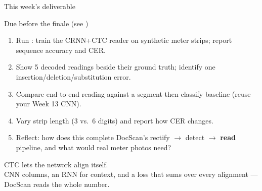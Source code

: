 \documentclass[10pt,aspectratio=169]{beamer}
\begin{document}
\begin{frame}{This week's deliverable}
  \begin{alertblock}{Due before the finale (see )}
    \begin{enumerate}
      \item Run : train the CRNN+CTC reader on synthetic meter strips; report sequence accuracy and CER.
      \item Show 5 decoded readings beside their ground truth; identify one insertion/deletion/substitution error.
      \item Compare end-to-end reading against a segment-then-classify baseline (reuse your Week 13 CNN).
      \item Vary strip length (3 vs.\ 6 digits) and report how CER changes.
      \item Reflect: how does this complete DocScan's rectify $\to$ detect $\to$ \textbf{read} pipeline, and what would real meter photos need?
    \end{enumerate}
  \end{alertblock}
\end{frame}

\begin{frame}[standout]
  CTC lets the network align itself.\\[4pt]
  \normalsize CNN columns, an RNN for context, and a loss that sums over every alignment --- DocScan reads the whole number.
\end{frame}
\end{document}
